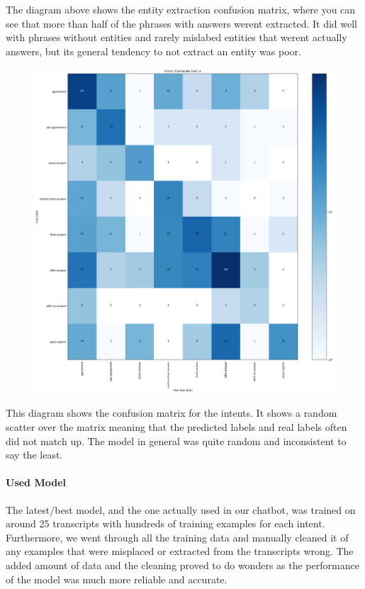 \documentclass[hidelinks, 11pt]{article}
\begin{document}
The diagram above shows the entity extraction confusion matrix, where you can see that more than half of the phrases with answers werent extracted.
It did well with phrases without entities and rarely mislabed entities that werent actually answers, but its general tendency to not extract an entity was poor.

\begin{figure}
  \includegraphics[width=\columnwidth]{../Rasa/Evaluation/Original_Model/intent_confusion_matrix.png}
\end{figure}

This diagram shows the confusion matrix for the intents.
It shows a random scatter over the matrix meaning that the predicted labels and real labels often did not match up.
The model in general was quite random and inconsistent to say the least.

\paragraph{Used Model} The latest/best model, and the one actually used in our chatbot, was trained on around 25 transcripts with hundreds of training examples for each intent. Furthermore, we went through all the training data and manually cleaned it of any examples that were misplaced or extracted from the transcripts wrong. The added amount of data and the cleaning proved to do wonders as the performance of the model was much more reliable and accurate.
\end{document}
